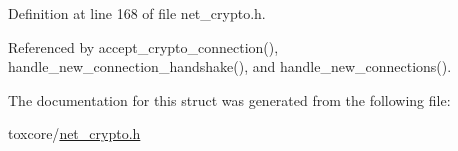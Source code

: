 Definition at line 168 of file net\+\_\+crypto.\+h.



Referenced by accept\+\_\+crypto\+\_\+connection(), handle\+\_\+new\+\_\+connection\+\_\+handshake(), and handle\+\_\+new\+\_\+connections().



The documentation for this struct was generated from the following file\+:\begin{DoxyCompactItemize}
\item 
toxcore/\hyperlink{net__crypto_8h}{net\+\_\+crypto.\+h}\end{DoxyCompactItemize}
